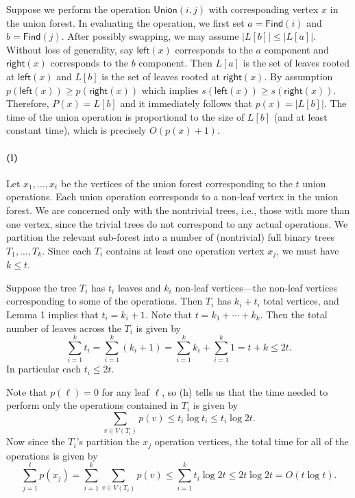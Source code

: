 \documentclass[12pt]{article}
\newcommand{\pnum}[1]{\paragraph{#1}}
\theoremstyle{definition}
\newcommand{\<}{\langle}
\renewcommand{\>}{\rangle}
\begin{document}
Suppose we perform the operation $\mathsf{Union}(i, j)$ with corresponding vertex $x$ in the union forest.
In evaluating the operation, we first set $a = \mathsf{Find}(i)$ and $b = \mathsf{Find}(j)$.
After possibly swapping, we may assume $|L[b]| \leq |L[a]|$.
Without loss of generality, say $\mathsf{left}(x)$ corresponds to the $a$ component and $\mathsf{right}(x)$ corresponds to the $b$ component.
Then $L[a]$ is the set of leaves rooted at $\mathsf{left}(x)$ and $L[b]$ is the set of leaves rooted at $\mathsf{right}(x)$.
By assumption $p(\mathsf{left}(x)) \geq p(\mathsf{right}(x))$ which implies $s(\mathsf{left}(x)) \geq s(\mathsf{right}(x))$.
Therefore, $P(x) = L[b]$ and it immediately follows that $p(x) = |L[b]|$.
The time of the union operation is proportional to the size of $L[b]$ (and at least constant time), which is precisely $O(p(x) + 1)$.

\pnum{(i)}

Let $x_1, \dots, x_t$ be the vertices of the union forest corresponding to the $t$ union operations.
Each union operation corresponds to a non-leaf vertex in the union forest.
We are concerned only with the nontrivial trees, i.e., those with more than one vertex, since the trivial trees do not correspond to any actual operations. 
We partition the relevant sub-forest into a number of (nontrivial) full binary trees $T_1, \dots, T_k$.
Since each $T_i$ contains at least one operation vertex $x_j$, we must have $k \leq t$.

Suppose the tree $T_i$ has $t_i$ leaves and $k_i$ non-leaf vertices---the non-leaf vertices corresponding to some of the operations.
Then $T_i$ has $k_i + t_i$ total vertices, and Lemma 1 implies that $t_i = k_i + 1$.
Note that $t = k_1 + \cdots + k_k$.
Then the total number of leaves across the $T_i$ is given by
\[
    \sum_{i=1}^{k} t_i
        = \sum_{i=1}^{k} (k_i + 1)
        = \sum_{i=1}^{k} k_i + \sum_{i=1}^{k} 1
        = t + k
        \leq 2t.
\]
In particular each $t_i \leq 2t$.


Note that $p(\ell) = 0$ for any leaf $\ell$, so (h) tells us that the time needed to perform only the operations contained in $T_i$ is given by
\[
    \sum_{v \in V(T_i)} p(v)
        \leq t_i \log t_i
        \leq t_i \log 2t.
\]
Now since the $T_i$'s partition the $x_j$ operation vertices, the total time for all of the operations is given by
\[
    \sum_{j=1}^{t} p(x_j)
        = \sum_{i=1}^{k} \sum_{v \in V(T_i)} p(v)
        \leq \sum_{i=1}^{k} t_i \log 2t
        \leq 2t \log 2t
        = O(t\log t).
\]
\end{document}
